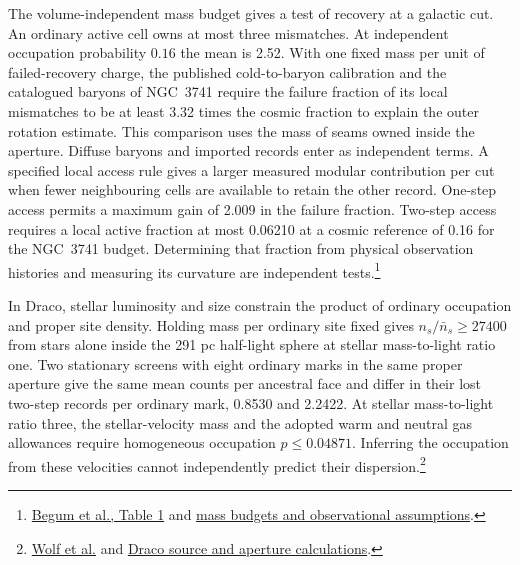 \documentclass[11pt]{article}
\begin{document}
The volume-independent mass budget gives a test of recovery at a galactic
cut. An ordinary active cell owns at most three mismatches. At independent
occupation probability $0.16$ the mean is 2.52. With one fixed mass per
unit of failed-recovery charge, the published cold-to-baryon calibration
and the catalogued baryons of NGC~3741 require the failure fraction of
its local mismatches to be at least 3.32 times the cosmic fraction to
explain the outer rotation estimate. This comparison uses the mass of
seams owned inside the aperture. Diffuse baryons and imported records
enter as independent terms. A specified local access rule gives a larger
measured modular contribution per cut when fewer neighbouring cells
are available to retain the other record. One-step access permits a
maximum gain of 2.009 in the failure fraction. Two-step access requires
a local active fraction at most 0.06210 at a cosmic reference of 0.16
for the NGC~3741 budget. Determining that fraction from physical
observation histories and measuring its curvature are independent tests.\footnote{\href{https://academic.oup.com/mnras/article/383/2/809/995293}{Begum et al., Table 1} and \href{https://github.com/FloatingPragma/observer-patch-holography/tree/main/code/cosmology/record_abundance}{mass budgets and observational assumptions}.}

In Draco, stellar luminosity and size constrain the product of ordinary
occupation and proper site density. Holding mass per ordinary site
fixed gives $n_s/\bar n_s\ge 27400$ from stars alone inside the 291 pc
half-light sphere at stellar mass-to-light ratio one. Two stationary
screens with eight ordinary marks in the same proper aperture give the
same mean counts per ancestral face and differ in their lost two-step
records per ordinary mark, 0.8530 and 2.2422. At stellar mass-to-light
ratio three, the stellar-velocity mass and the adopted warm and neutral
gas allowances require homogeneous occupation $p\le0.04871$. Inferring
the occupation from these velocities cannot independently predict their
dispersion.\footnote{\href{https://arxiv.org/abs/0908.2995}{Wolf et al.}
and \href{https://github.com/FloatingPragma/observer-patch-holography/tree/main/code/cosmology/record_abundance}{Draco source and aperture calculations}.}
\end{document}
